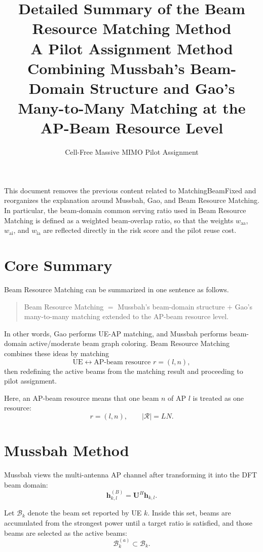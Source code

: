 \documentclass[11pt,a4paper]{article}
\title{\textbf{Detailed Summary of the Beam Resource Matching Method}\\
\large A Pilot Assignment Method Combining Mussbah's Beam-Domain Structure and Gao's Many-to-Many Matching at the AP-Beam Resource Level}
\author{Cell-Free Massive MIMO Pilot Assignment}
\date{}
\newcommand{\waa}{w_{\mathrm{aa}}}
\newcommand{\wai}{w_{\mathrm{ai}}}
\newcommand{\wia}{w_{\mathrm{ia}}}
\begin{document}
\maketitle

This document removes the previous content related to MatchingBeamFixed and reorganizes the explanation around Mussbah, Gao, and Beam Resource Matching. In particular, the beam-domain common serving ratio used in Beam Resource Matching is defined as a weighted beam-overlap ratio, so that the weights \(\waa\), \(\wai\), and \(\wia\) are reflected directly in the risk score and the pilot reuse cost.

\tableofcontents
\newpage

\section{Core Summary}

Beam Resource Matching can be summarized in one sentence as follows.

\begin{quote}
Beam Resource Matching \(=\) Mussbah's beam-domain structure \(+\) Gao's many-to-many matching extended to the AP-beam resource level.
\end{quote}

In other words, Gao performs UE-AP matching, and Mussbah performs beam-domain active/moderate beam graph coloring. Beam Resource Matching combines these ideas by matching
\[
    \mathrm{UE} \leftrightarrow \text{AP-beam resource } r=(l,n),
\]
then redefining the active beams from the matching result and proceeding to pilot assignment.

Here, an AP-beam resource means that one beam \(n\) of AP \(l\) is treated as one resource:
\[
    r=(l,n), \qquad |\mathcal{R}|=LN.
\]

\section{Mussbah Method}

Mussbah views the multi-antenna AP channel after transforming it into the DFT beam domain:
\[
    \mathbf{h}_{k,l}^{(B)}=\mathbf{U}^{H}\mathbf{h}_{k,l}.
\]

Let \(\mathcal{B}_k\) denote the beam set reported by UE \(k\). Inside this set, beams are accumulated from the strongest power until a target ratio is satisfied, and those beams are selected as the active beams:
\[
    \mathcal{B}_{k}^{(a)} \subset \mathcal{B}_k.
\]
\end{document}
